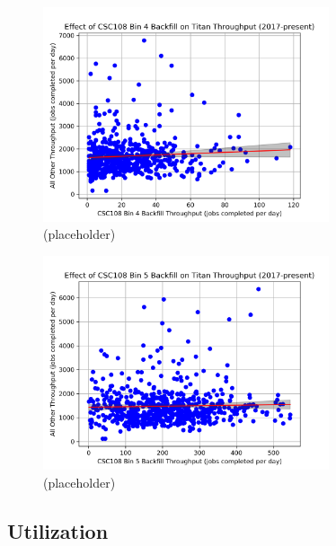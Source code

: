 \begin{figure}
  \includegraphics[width=0.75\textwidth]{images/linfit-throughput-bin4.png}
\caption{(placeholder)}
\label{fig:throughput-bin4}
\end{figure}

\begin{figure}
  \includegraphics[width=0.75\textwidth]{images/linfit-throughput-bin5.png}
\caption{(placeholder)}
\label{fig:throughput-bin5}
\end{figure}


\subsection{Utilization}
\label{subsec:utilization}

